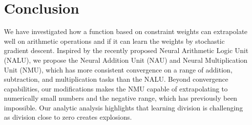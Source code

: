 \section{Conclusion}
We have investigated how a function based on constraint weights can extrapolate well on arithmetic operations and if it can learn the weights by stochastic gradient descent.
Inspired by the recently proposed Neural Arithmetic Logic Unit (NALU), we propose the Neural Addition Unit (NAU) and Neural Multiplication Unit (NMU), which has more consistent convergence on a range of addition, subtraction, and multiplication tasks than the NALU.
Beyond convergence capabilities, our modifications makes the NMU capable of extrapolating to numerically small numbers and the negative range, which has previously been impossible.
Our analytic analysis highlights that learning division is challenging as division close to zero creates explosions.


